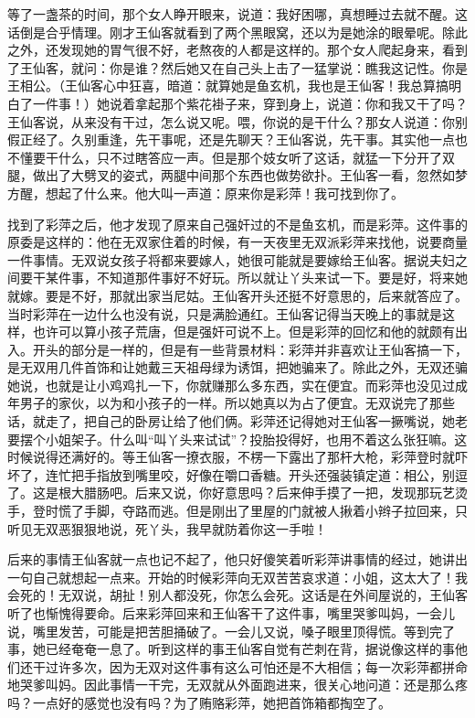 等了一盏茶的时间，那个女人睁开眼来，说道：我好困哪，真想睡过去就不醒。这话倒是合乎情理。刚才王仙客就看到了两个黑眼窝，还以为是她涂的眼晕呢。除此之外，还发现她的胃气很不好，老熬夜的人都是这样的。那个女人爬起身来，看到了王仙客，就问：你是谁？然后她又在自己头上击了一猛掌说：瞧我这记性。你是王相公。（王仙客心中狂喜，暗道：就算她是鱼玄机，我也是王仙客！我总算搞明白了一件事！）她说着拿起那个紫花褂子来，穿到身上，说道：你和我又干了吗？王仙客说，从来没有干过，怎么说又呢。喂，你说的是干什么？那女人说道：你别假正经了。久别重逢，先干事呢，还是先聊天？王仙客说，先干事。其实他一点也不懂要干什么，只不过瞎答应一声。但是那个妓女听了这话，就猛一下分开了双腿，做出了大劈叉的姿式，两腿中间那个东西也做势欲扑。王仙客一看，忽然如梦方醒，想起了什么来。他大叫一声道：原来你是彩萍！我可找到你了。 

找到了彩萍之后，他才发现了原来自己强奸过的不是鱼玄机，而是彩萍。这件事的原委是这样的：他在无双家住着的时候，有一天夜里无双派彩萍来找他，说要商量一件事情。无双说女孩子将都来要嫁人，她很可能就是要嫁给王仙客。据说夫妇之间要干某件事，不知道那件事好不好玩。所以就让丫头来试一下。要是好，将来她就嫁。要是不好，那就出家当尼姑。王仙客开头还挺不好意思的，后来就答应了。当时彩萍在一边什么也没有说，只是满脸通红。王仙客记得当天晚上的事就是这样，也许可以算小孩子荒唐，但是强奸可说不上。但是彩萍的回忆和他的就颇有出入。开头的部分是一样的，但是有一些背景材料：彩萍并非喜欢让王仙客搞一下，是无双用几件首饰和让她戴三天祖母绿为诱饵，把她骗来了。除此之外，无双还骗她说，也就是让小鸡鸡扎一下，你就赚那么多东西，实在便宜。而彩萍也没见过成年男子的家伙，以为和小孩子的一样。所以她真以为占了便宜。无双说完了那些话，就走了，把自己的卧房让给了他们俩。彩萍还记得她对王仙客一撅嘴说，她老要摆个小姐架子。什么叫“叫丫头来试试”？投胎投得好，也用不着这么张狂嘛。这时候说得还满好的。等王仙客一撩衣服，不楞一下露出了那杆大枪，彩萍登时就吓坏了，连忙把手指放到嘴里咬，好像在嚼口香糖。开头还强装镇定道：相公，别逗了。这是根大腊肠吧。后来又说，你好意思吗？后来伸手摸了一把，发现那玩艺烫手，登时慌了手脚，夺路而逃。但是刚出了里屋的门就被人揪着小辫子拉回来，只听见无双恶狠狠地说，死丫头，我早就防着你这一手啦！ 

后来的事情王仙客就一点也记不起了，他只好傻笑着听彩萍讲事情的经过，她讲出一句自己就想起一点来。开始的时候彩萍向无双苦苦哀求道：小姐，这太大了！我会死的！无双说，胡扯！别人都没死，你怎么会死。这话是在外间屋说的，王仙客听了也惭愧得要命。后来彩萍回来和王仙客干了这件事，嘴里哭爹叫妈，一会儿说，嘴里发苦，可能是把苦胆捅破了。一会儿又说，嗓子眼里顶得慌。等到完了事，她已经奄奄一息了。听到这样的事王仙客自觉有芒刺在背，据说像这样的事他们还干过许多次，因为无双对这件事有这么可怕还是不大相信；每一次彩萍都拼命地哭爹叫妈。因此事情一干完，无双就从外面跑进来，很关心地问道：还是那么疼吗？一点好的感觉也没有吗？为了贿赂彩萍，她把首饰箱都掏空了。 


